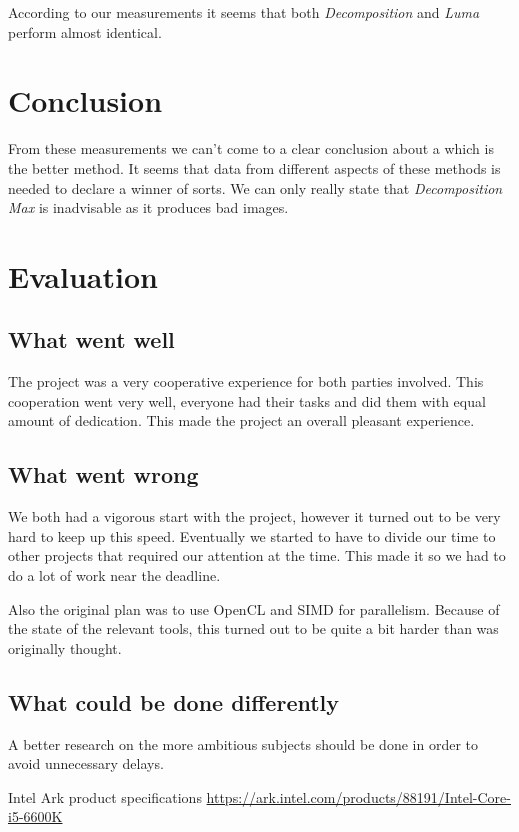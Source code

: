 \documentclass[a4paper]{article}
\begin{document}
According to our measurements it seems that both \textit{Decomposition} and \textit{Luma} perform almost identical.

\section{Conclusion}
From these measurements we can't come to a clear conclusion about a which is the better method. It seems that data from different aspects of these methods is needed to declare a winner of sorts. We can only really state that \textit{Decomposition Max} is inadvisable as it produces bad images.

\section{Evaluation}
\subsection{What went well}
The project was a very cooperative experience for both parties involved. This cooperation went very well, everyone had their tasks and did them with equal amount of dedication. This made the project an overall pleasant experience.
\subsection{What went wrong}
We both had a vigorous start with the project, however it turned out to be very hard to keep up this speed. Eventually we started to have to divide our time to other projects that required our attention at the time. This made it so we had to do a lot of work near the deadline.

Also the original plan was to use OpenCL and SIMD for parallelism. Because of the state of the relevant tools, this turned out to be quite a bit harder than was originally thought.
\subsection{What could be done differently}
A better research on the more ambitious subjects should be done in order to avoid unnecessary delays.

\begin{thebibliography}{9}

	Intel
	Ark product specifications
	\url{https://ark.intel.com/products/88191/Intel-Core-i5-6600K}
	
\end{thebibliography}
\end{document}
